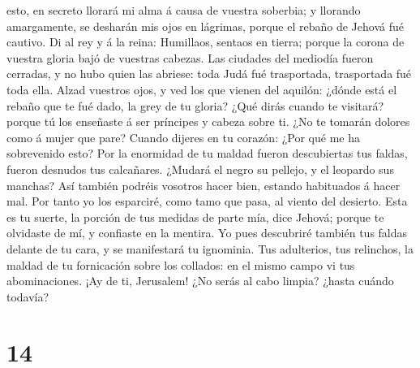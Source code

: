 esto, en secreto llorará mi alma á causa de vuestra soberbia; y llorando
amargamente, se desharán mis ojos en lágrimas, porque el rebaño de
Jehová fué cautivo.  Di al rey y á la reina: Humillaos,
sentaos en tierra; porque la corona de vuestra gloria bajó de vuestras
cabezas.  Las ciudades del mediodía fueron cerradas, y no
hubo quien las abriese: toda Judá fué trasportada, trasportada fué toda
ella.  Alzad vuestros ojos, y ved los que vienen del
aquilón: ¿dónde está el rebaño que te fué dado, la grey de tu gloria?
 ¿Qué dirás cuando te visitará? porque tú los enseñaste á
ser príncipes y cabeza sobre ti. ¿No te tomarán dolores como á mujer que
pare?  Cuando dijeres en tu corazón: ¿Por qué me ha
sobrevenido esto? Por la enormidad de tu maldad fueron descubiertas tus
faldas, fueron desnudos tus calcañares.  ¿Mudará el negro
su pellejo, y el leopardo sus manchas? Así también podréis vosotros
hacer bien, estando habituados á hacer mal.  Por tanto yo
los esparciré, como tamo que pasa, al viento del desierto. 
Esta es tu suerte, la porción de tus medidas de parte mía, dice Jehová;
porque te olvidaste de mí, y confiaste en la mentira.  Yo
pues descubriré también tus faldas delante de tu cara, y se manifestará
tu ignominia.  Tus adulterios, tus relinchos, la maldad de
tu fornicación sobre los collados: en el mismo campo vi tus
abominaciones. ¡Ay de ti, Jerusalem! ¿No serás al cabo limpia? ¿hasta
cuándo todavía?

\hypertarget{section-13}{%
\section{14}\label{section-13}}

